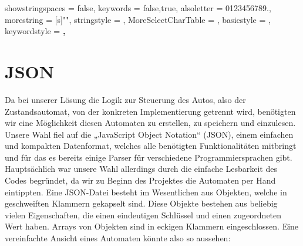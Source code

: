 \newcommand\JSONnumbervaluestyle{\color{blue}}
\newcommand\JSONstringvaluestyle{\color{red}}

\newif\ifcolonfoundonthisline

\makeatletter

{
  showstringspaces    = false,
  keywords            = {false,true},
  alsoletter          = 0123456789.,
  morestring          = [s]{"}{"},
  stringstyle         = \ifcolonfoundonthisline\JSONstringvaluestyle\fi,
  MoreSelectCharTable =%
    \colon@json{\processColon@json},
  basicstyle          = \ttfamily,
  keywordstyle        = \ttfamily\bfseries,
}

\newcommand\processColon@json{%
  \colon@json%
  \ifnum\lst@mode=\lst@Pmode%
    \global\colonfoundonthislinetrue%
  \fi
}

\lst@AddToHook{Output}{%
  \ifcolonfoundonthisline%
    \ifnum\lst@mode=\lst@Pmode%
      \def\lst@thestyle{\JSONnumbervaluestyle}%
    \fi
  \fi
  \lsthk@DetectKeywords%
}

%
  {\global\colonfoundonthislinefalse}

\makeatother

\section{JSON}
\label{sec:json}
Da bei unserer Lösung die Logik zur Steuerung des Autos, also der Zustandsautomat, von der konkreten Implementierung getrennt wird, benötigten wir eine Möglichkeit diesen Automaten zu erstellen, zu speichern und einzulesen.
Unsere Wahl fiel auf die „JavaScript Object Notation“ (JSON), einem einfachen und kompakten Datenformat, welches alle benötigten Funktionalitäten mitbringt und für das es bereits einige Parser für verschiedene Programmiersprachen gibt. Hauptsächlich war unsere Wahl allerdings durch die einfache Lesbarkeit des Codes begründet, da wir zu Beginn des Projektes die Automaten per Hand eintippten.
Eine JSON-Datei besteht im Wesentlichen aus Objekten, welche in geschweiften Klammern gekapselt sind. Diese Objekte bestehen aus beliebig vielen Eigenschaften, die einen eindeutigen Schlüssel und einen zugeordneten Wert haben. Arrays von Objekten sind in eckigen Klammern eingeschlossen. Eine vereinfachte Ansicht eines Automaten könnte also so aussehen:

